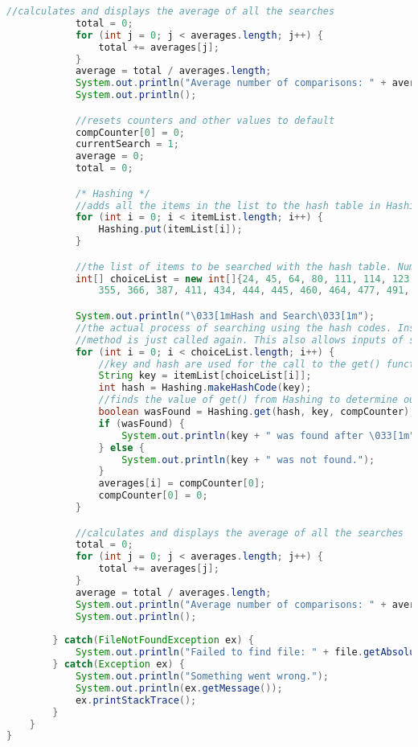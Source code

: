 \documentclass[letterpaper, 10pt,DIV=13]{scrartcl}
\numberwithin{equation}{section} %
\numberwithin{figure}{section} %
\numberwithin{table}{section} %
\begin{document}
\begin{lstlisting}[frame=single, language=java, breaklines]
            //calculates and displays the average of all the searches
            total = 0;
            for (int j = 0; j < averages.length; j++) {
                total += averages[j];
            }
            average = total / averages.length;
            System.out.println("Average number of comparisons: " + average);
            System.out.println();

            //resets counters and other values to default
            compCounter[0] = 0;
            currentSearch = 1;
            average = 0;
            total = 0;

            /* Hashing */
            //adds all the items in the list to the hash table in Hashing.java
            for (int i = 0; i < itemList.length; i++) {
                Hashing.put(itemList[i]);
            }

            //the list of items to be searched with the hash table. Numbers were all chosen randomly once with an external number generator.
            int[] choiceList = new int[]{24, 45, 64, 80, 111, 114, 123, 152, 192, 205, 225, 232, 236, 249, 262, 269, 301, 302, 320, 324, 339,
                355, 366, 387, 411, 434, 444, 445, 460, 464, 477, 491, 507, 545, 556, 577, 581, 604, 615, 639, 657, 665};

            System.out.println("\033[1mHash and Search\033[1m");
            //the actual process of searching using the hash codes. Instead of storing all the hash codes in an array, the makeHashCode
            //method is just called again. This also allows inputs of strings that are not in the itemList array.
            for (int i = 0; i < choiceList.length; i++) {
                //key and hash are used for the call to the get() function in hashing
                String key = itemList[choiceList[i]];
                int hash = Hashing.makeHashCode(key);
                //finds the value of get() from Hashing to determine outut
                boolean wasFound = Hashing.get(hash, key, compCounter);
                if (wasFound) {
                    System.out.println(key + " was found after \033[1m" + compCounter[0] + "\033[0m comparisons.");
                } else {
                    System.out.println(key + " was not found.");
                }
                averages[i] = compCounter[0];
                compCounter[0] = 0;
            }

            //calculates and displays the average of all the searches
            total = 0;
            for (int j = 0; j < averages.length; j++) {
                total += averages[j];
            }
            average = total / averages.length;
            System.out.println("Average number of comparisons: " + average);
            System.out.println();
            
        } catch(FileNotFoundException ex) {
			System.out.println("Failed to find file: " + file.getAbsolutePath());
        } catch(Exception ex) {
            System.out.println("Something went wrong.");
            System.out.println(ex.getMessage());
            ex.printStackTrace();
        }
    }
}
\end{lstlisting}
\end{document}
